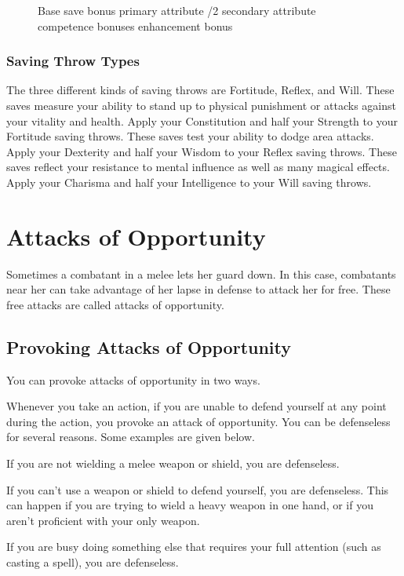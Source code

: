 \begin{figure}[h]
\centering Base save bonus \add primary attribute /2 secondary attribute \add competence bonuses \add enhancement bonus
\end{figure}

\subsubsection{Saving Throw Types}
The three different kinds of saving throws are Fortitude, Reflex, and Will.
 These saves measure your ability to stand up to physical punishment or attacks against your vitality and health. Apply your Constitution and half your Strength to your Fortitude saving throws.
 These saves test your ability to dodge area attacks. Apply your Dexterity and half your Wisdom to your Reflex saving throws.
 These saves reflect your resistance to mental influence as well as many magical effects. Apply your Charisma and half your Intelligence to your Will saving throws.

\section{Attacks of Opportunity}\label{Attacks of Opportunity}
Sometimes a combatant in a melee lets her guard down. In this case, combatants near her can take advantage of her lapse in defense to attack her for free. These free attacks are called attacks of opportunity.

\subsection{Provoking Attacks of Opportunity}
You can provoke attacks of opportunity in two ways.

 Whenever you take an action, if you are unable to defend yourself at any point during the action, you provoke an attack of opportunity. You can be defenseless for several reasons. Some examples are given below.

\begin{itemize*}
    \item If you are not wielding a melee weapon or shield, you are defenseless.
    \item If you can't use a weapon or shield to defend yourself, you are defenseless. This can happen if you are trying to wield a heavy weapon in one hand, or if you aren't proficient with your only weapon.
    \item If you are busy doing something else that requires your full attention (such as casting a spell), you are defenseless.
\end{itemize*}

